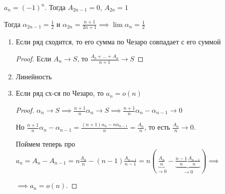 \begin{example}
    $a_n = (-1)^n$. Тогда $A_{2n-1} = 0$, $A_{2n} = 1$

    Тогда $\alpha_{2n - 1} = \frac{1}{2}$ и $\alpha_{2n} = \frac{n + 1}{2n + 1} \implies \lim \alpha_n = \frac{1}{2}$
\end{example}

\begin{properties}
    \begin{enumerate}
        \item {
            Если ряд сходится, то его сумма по Чезаро совпадает с его суммой

            \begin{proof}
                Если $A_n \rightarrow S$, то $\frac{A_0 + \ldots + A_n}{n + 1} \rightarrow S$
            \end{proof}
        }
        \item {
            Линейность
        }
        \item {
            Если ряд сх-ся по Чезаро, то $a_n = o(n)$
            


            \begin{proof}
                $\alpha_n \to S \implies \frac{n+1}{n} \alpha_n \to S \implies \frac{n + 1}{n} \alpha_n  - \alpha_{n - 1} \to 0$

                Но $\frac{n + 1}{n} \alpha_n  - \alpha_{n - 1} = \frac{(n+1) \alpha_n - n \alpha_{n- 1}}{n} = \frac{A_n}{n}$, то есть $\frac{A_n}{n} \to 0$.

                Поймем теперь про $a_n = A_n - A_{n - 1} = n \frac{A_n}{n} - (n - 1) \frac{A_{n - 1}}{n - 1} = n \left( \underbrace{\frac{A_n}{n}}_{\to 0} - \underbrace{\frac{n - 1}{n} \frac{A_{n - 1}}{n}}_{\to 0} \right) \implies$
                
                $\implies a_n = o(n)$.
            \end{proof}
        }
    \end{enumerate}
\end{properties}

